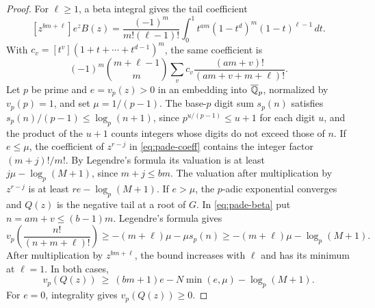 \begin{proof}
For \(\ell\ge1\), a beta integral gives the tail coefficient
\[
 [z^{bm+\ell}]e^z B(z)
 =\frac{(-1)^m}{m!(\ell-1)!}
       \int_0^1 t^{am}(1-t^d)^m(1-t)^{\ell-1}\,dt.
\]
With \(c_v=[t^v](1+t+\cdots+t^{d-1})^m\), the same coefficient is
\begin{equation}\label{eq:pade-beta}
 (-1)^m\binom{m+\ell-1}{m}
       \sum_v c_v \frac{(am+v)!}{(am+v+m+\ell)!}.
\end{equation}
Let \(p\) be prime and \(e=v_p(z)>0\) in an embedding into
\(\overline{\mathbb Q}_p\), normalized by \(v_p(p)=1\), and set
\(\mu=1/(p-1)\). The base-\(p\) digit sum \(s_p(n)\) satisfies
\(s_p(n)/(p-1)\le\log_p(n+1)\), since
\(p^{u/(p-1)}\le u+1\) for each digit \(u\), and the product
of the \(u+1\) counts integers whose digits do not exceed
those of \(n\). If \(e\le\mu\), the coefficient of \(z^{r-j}\) in
\eqref{eq:pade-coeff} contains the integer factor \((m+j)!/m!\).
By Legendre's formula its valuation is at least
\(j\mu-\log_p(M+1)\), since \(m+j\le bm\).
The valuation after multiplication by \(z^{r-j}\) is at least
\(re-\log_p(M+1)\).
If \(e>\mu\), the \(p\)-adic exponential converges and \(Q(z)\)
is the negative tail at a root of \(G\). In \eqref{eq:pade-beta}
put \(n=am+v\le(b-1)m\). Legendre's formula gives
\[
 v_p\!\left(\frac{n!}{(n+m+\ell)!}\right)
 \ge -(m+\ell)\mu-\mu s_p(n)
 \ge -(m+\ell)\mu-\log_p(M+1).
\]
After multiplication by \(z^{bm+\ell}\), the bound increases
with \(\ell\) and has its minimum at \(\ell=1\). In both cases,
\begin{equation}\label{eq:pade-local}
 v_p(Q(z))\ \ge\ (bm+1)e-N\min(e,\mu)-\log_p(M+1).
\end{equation}
For \(e=0\), integrality gives \(v_p(Q(z))\ge0\).


\end{proof}
